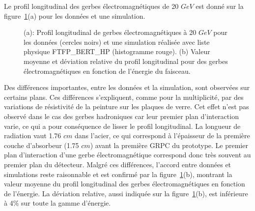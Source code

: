 Le profil longitudinal des gerbes électromagnétiques de 20 $GeV$ est donné sur la figure~\ref{fig.longi_e-}(a) pour les données et une simulation. 
\begin{figure}[!ht]
  \caption{(a): Profil longitudinal de gerbes électromagnétiques à 20 $GeV$ pour les données (cercles noirs) et une simulation réalisée avec liste physique FTFP\_BERT\_HP (histogramme rouge). (b) Valeur moyenne et déviation relative du profil longitudinal pour des gerbes électromagnétiques en fonction de l'énergie du faisceau.}
  \label{fig.longi_e-}
\end{figure}
Des différences importantes, entre les données et la simulation, sont observées sur certains plans. Ces différences s'expliquent, comme pour la multiplicité, par des variations de résistivité de la peinture sur les plaques de verre. Cet effet n'est pas observé dans le cas des gerbes hadroniques car leur premier plan d'interaction varie, ce qui a pour conséquence de lisser le profil longitudinal. La longueur de radiation vaut 1.76 $cm$ dans l'acier, ce qui correspond à l'épaisseur de la première couche d'absorbeur (1.75 $cm$) avant la première GRPC du prototype. Le premier plan d'interaction d'une gerbe électromagnétique correspond donc très souvent au premier plan du détecteur. Malgré ces différences, l'accord entre données et simulations reste raisonnable et est confirmé par la figure~\ref{fig.longi_e-}(b), montrant la valeur moyenne du profil longitudinal des gerbes électromagnétiques en fonction de l'énergie. La déviation relative, aussi indiquée sur la figure~\ref{fig.longi_e-}(b), est inférieure à 4$\%$ sur toute la gamme d'énergie.

